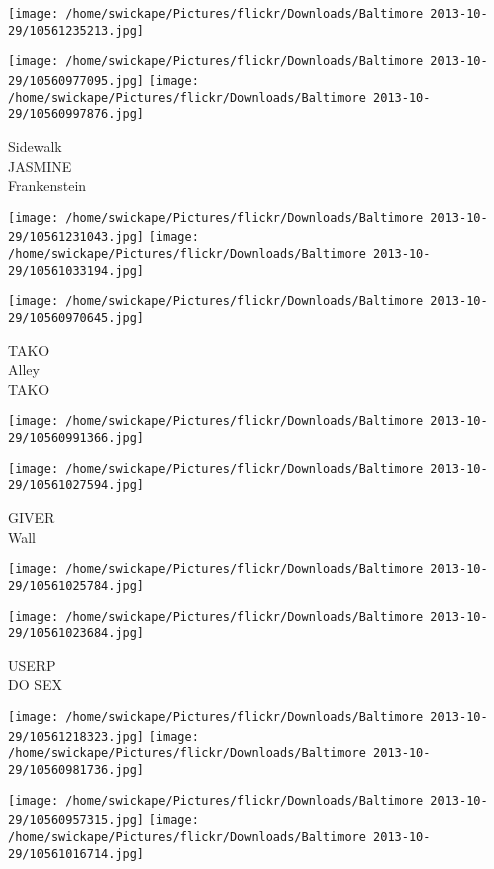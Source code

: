 \documentclass[10pt,letterpaper]{article}
\begin{document}
\texttt{[image: /home/swickape/Pictures/flickr/Downloads/Baltimore 2013-10-29/10561235213.jpg]}

\vspace{0.25in}
\texttt{[image: /home/swickape/Pictures/flickr/Downloads/Baltimore 2013-10-29/10560977095.jpg]}
\texttt{[image: /home/swickape/Pictures/flickr/Downloads/Baltimore 2013-10-29/10560997876.jpg]}

Sidewalk\\
JASMINE\\
Frankenstein
\pagebreak

\texttt{[image: /home/swickape/Pictures/flickr/Downloads/Baltimore 2013-10-29/10561231043.jpg]}
\texttt{[image: /home/swickape/Pictures/flickr/Downloads/Baltimore 2013-10-29/10561033194.jpg]}

\texttt{[image: /home/swickape/Pictures/flickr/Downloads/Baltimore 2013-10-29/10560970645.jpg]}

TAKO\\
Alley\\
TAKO
\pagebreak

\texttt{[image: /home/swickape/Pictures/flickr/Downloads/Baltimore 2013-10-29/10560991366.jpg]}

\vspace{0.25in}
\texttt{[image: /home/swickape/Pictures/flickr/Downloads/Baltimore 2013-10-29/10561027594.jpg]}

GIVER\\
Wall
\pagebreak

\texttt{[image: /home/swickape/Pictures/flickr/Downloads/Baltimore 2013-10-29/10561025784.jpg]}

\vspace{0.25in}
\texttt{[image: /home/swickape/Pictures/flickr/Downloads/Baltimore 2013-10-29/10561023684.jpg]}

USERP\\
DO SEX
\pagebreak

\texttt{[image: /home/swickape/Pictures/flickr/Downloads/Baltimore 2013-10-29/10561218323.jpg]}
\texttt{[image: /home/swickape/Pictures/flickr/Downloads/Baltimore 2013-10-29/10560981736.jpg]}

\texttt{[image: /home/swickape/Pictures/flickr/Downloads/Baltimore 2013-10-29/10560957315.jpg]}
\texttt{[image: /home/swickape/Pictures/flickr/Downloads/Baltimore 2013-10-29/10561016714.jpg]}
\end{document}
